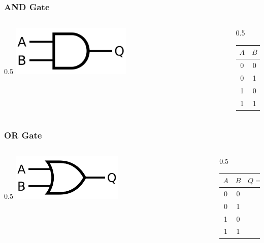 \documentclass[aspectratio=169, 11pt, handout]{beamer}
\begin{document}
\begin{frame}
  \frametitle{AND Gate}
\begin{columns}
\begin{column}{0.5\textwidth}
\centering\includegraphics[width=0.5\textwidth]{1024px-AND_ANSI_Labelled.png}
\end{column}
\begin{column}{0.5\textwidth}

\pause
\begin{center}
\begin{tabular}{cc|c}
\toprule
$A$ & $B$ & $Q=AB$\\
\midrule
0 & 0 & 0\\
0 & 1 & 0\\
1 & 0 & 0\\
1 & 1 & 1\\
\bottomrule
\end{tabular}
\end{center}

\end{column}
\end{columns}
\end{frame}

\begin{frame}
  \frametitle{OR Gate}
\begin{columns}
\begin{column}{0.5\textwidth}
\centering\includegraphics[width=0.5\textwidth]{640px-OR_ANSI_Labelled.png}
\end{column}
\begin{column}{0.5\textwidth}

\pause
\begin{center}
\begin{tabular}{cc|c}
\toprule
$A$ & $B$ & $Q=A+B$\\
\midrule
0 & 0 & 0\\
0 & 1 & 1\\
1 & 0 & 1\\
1 & 1 & 1\\
\bottomrule
\end{tabular}
\end{center}

\end{column}
\end{columns}
\end{frame}
\end{document}
